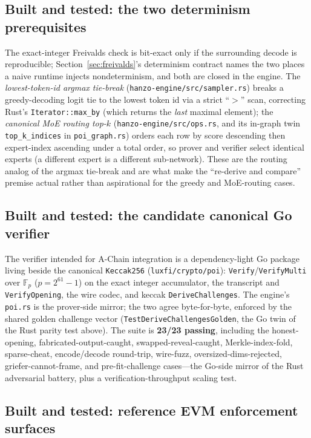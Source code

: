 \subsection{Built and tested: the two determinism prerequisites}

The exact-integer Freivalds check is bit-exact only if the surrounding decode is
reproducible; Section~\ref{sec:freivalds}'s determinism contract names the two places a
naive runtime injects nondeterminism, and both are closed in the engine. The
\emph{lowest-token-id argmax tie-break} (\texttt{hanzo-engine/src/sampler.rs}) breaks a
greedy-decoding logit tie to the lowest token id via a strict ``$>$'' scan, correcting
Rust's \texttt{Iterator::max\_by} (which returns the \emph{last} maximal element); the
\emph{canonical MoE routing top-$k$} (\texttt{hanzo-engine/src/ops.rs}, and its in-graph
twin \texttt{top\_k\_indices} in \texttt{poi\_graph.rs}) orders each row by score descending
then expert-index ascending under a total order, so prover and verifier select identical
experts (a different expert is a different sub-network). These are the routing analog of the
argmax tie-break and are what make the ``re-derive and compare'' premise actual rather than
aspirational for the greedy and MoE-routing cases.

\subsection{Built and tested: the candidate canonical Go verifier}

The verifier intended for A-Chain integration is a dependency-light Go package living beside the canonical
\texttt{Keccak256} (\texttt{luxfi/crypto/poi}): \texttt{Verify}/\texttt{VerifyMulti} over
$\mathbb{F}_p$ ($p=2^{61}-1$) on the exact integer accumulator, the transcript and
\texttt{VerifyOpening}, the wire codec, and keccak \texttt{DeriveChallenges}. The engine's
\texttt{poi.rs} is the prover-side mirror; the two agree byte-for-byte, enforced by the
shared golden challenge vector (\texttt{TestDeriveChallengesGolden}, the Go twin of the
Rust parity test above). The suite is \textbf{23/23 passing}, including the honest-opening,
fabricated-output-caught, swapped-reveal-caught, Merkle-index-fold, sparse-cheat,
encode/decode round-trip, wire-fuzz, oversized-dims-rejected, griefer-cannot-frame, and
pre-fit-challenge cases---the Go-side mirror of the Rust adversarial battery, plus a
verification-throughput scaling test.

\subsection{Built and tested: reference EVM enforcement surfaces}

